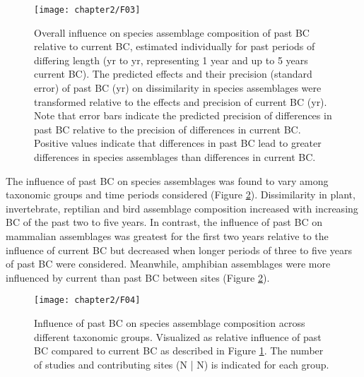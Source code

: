 \begin{figure}[h]
\centering
\texttt{[image: chapter2/F03]}
\caption{Overall influence on species assemblage composition of past BC relative to current BC, estimated individually for past periods of differing length (yr to yr, representing 1 year and up to 5 years current BC). The predicted effects and their precision (standard error) of past BC (yr) on dissimilarity in species assemblages were transformed relative to the effects and precision of current BC (yr). Note that error bars indicate the predicted precision of differences in past BC relative to the precision of differences in current BC. Positive values indicate that differences in past BC lead to greater differences in species assemblages than differences in current BC.}
\label{F02_03}
\end{figure}
The influence of past BC on species assemblages was found to vary among taxonomic groups and time periods considered (Figure \ref{F02_04}). Dissimilarity in plant, invertebrate, reptilian and bird assemblage composition increased with increasing BC of the past two to five years. In contrast, the influence of past BC on mammalian assemblages was greatest for the first two years relative to the influence of current BC but decreased when longer periods of three to five years of past BC were considered. Meanwhile, amphibian assemblages were more influenced by current than past BC between sites (Figure \ref{F02_04}).
\begin{figure}[h]
\centering
\texttt{[image: chapter2/F04]}
\caption{Influence of past BC on species assemblage composition across different taxonomic groups. Visualized as relative influence of past BC compared to current BC as described in Figure \ref{F02_03}. The number of studies and contributing sites (N | N) is indicated for each group.}
\label{F02_04}
\end{figure}
